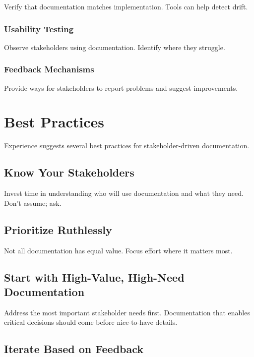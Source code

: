 \documentclass[11pt]{article}
\begin{document}
Verify that documentation matches implementation. Tools can help detect drift.

\subsubsection{Usability Testing}

Observe stakeholders using documentation. Identify where they struggle.

\subsubsection{Feedback Mechanisms}

Provide ways for stakeholders to report problems and suggest improvements.

\section{Best Practices}

Experience suggests several best practices for stakeholder-driven documentation.

\subsection{Know Your Stakeholders}

Invest time in understanding who will use documentation and what they need. Don't assume; ask.

\subsection{Prioritize Ruthlessly}

Not all documentation has equal value. Focus effort where it matters most.

\subsection{Start with High-Value, High-Need Documentation}

Address the most important stakeholder needs first. Documentation that enables critical decisions should come before nice-to-have details.

\subsection{Iterate Based on Feedback}
\end{document}
